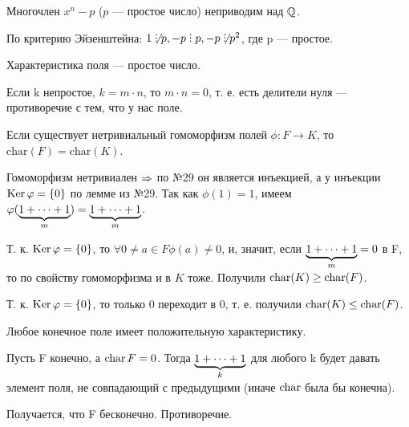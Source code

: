 \begin{problem}
Многочлен $x^n - p$ ($p$ --- простое число) неприводим над $\mathbb{Q}$.
\end{problem}

\begin{solution}
По критерию Эйзенштейна: \(1 \not\Divby p, -p \Divby p, -p \not\Divby p^2\), где p --- простое.
\end{solution}

\begin{problem}[26(6.3)]
Характеристика поля --- простое число.
\end{problem}

\begin{solution}
Если k непростое, \(k=m\cdot n\), то \(m\cdot n = 0\), т. е. есть делители нуля --- противоречие с тем, что у нас поле.
\end{solution}

\begin{problem}
Если существует нетривиальный гомоморфизм полей $\phi: F \to K$, то $\mathrm{char}(F) = \mathrm{char}(K)$.
\end{problem}

\begin{solution}
Гомоморфизм нетривиален $\Rightarrow$ по №29 он является инъекцией, а у инъекции \(\operatorname{Ker} \varphi = \{0\}\) по лемме из №29.
Так как \(\phi(1) = 1\), имеем \(\varphi(\underbrace{1+\dots+1}_{m}) = \underbrace{1+\dots+1}_{m}\). 

Т. к. \(\operatorname{Ker} \varphi = \{0\}\), то $\forall 0 \ne a \in F \phi(a) \ne 0$, и, значит, если \(\underbrace{1+\dots+1}_{m} = 0\) в F, то по свойству гомоморфизма и в $K$ тоже. Получили $\operatorname{char}(K) \ge \operatorname{char}(F)$.

Т. к. \(\operatorname{Ker} \varphi = \{0\}\), то только 0 переходит в 0, т. е. получили $\operatorname{char}(K) \le \operatorname{char}(F)$.

\end{solution}

\begin{problem}[28(6.5)]
Любое конечное поле имеет положительную характеристику.
\end{problem}

\begin{solution}
Пусть F конечно, а \(\operatorname{char} F = 0\). Тогда \(\underbrace{1+\dots+1}_{k}\) для любого k будет давать элемент поля, не совпадающий с предыдущими (иначе \(\operatorname{char}\) была бы конечна).

Получается, что F бесконечно. Противоречие.
\end{solution}

